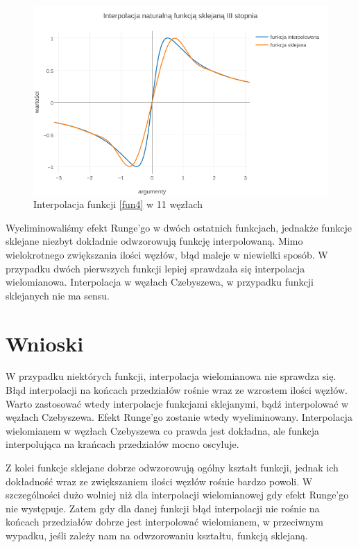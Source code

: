 \documentclass{article}
\begin{document}
\begin{figure}[ht]
	\begin{center}
		\includegraphics[width=13cm]{spline_d}
	\end{center}
	\caption{Interpolacja funkcji \eqref{fun4} w 11 węzłach}
	\label{fig:rysunek4}
\end{figure}


Wyeliminowaliśmy efekt Runge'go w dwóch ostatnich funkcjach, jednakże funkcje sklejane niezbyt dokładnie odwzorowują funkcję interpolowaną. Mimo wielokrotnego zwiększania ilości węzłów, błąd maleje w niewielki sposób. W przypadku dwóch pierwszych funkcji lepiej sprawdzała się interpolacja wielomianowa. Interpolacja w węzłach Czebyszewa, w przypadku funkcji sklejanych nie ma sensu.
	
	
\section{Wnioski}

W przypadku niektórych funkcji, interpolacja wielomianowa nie sprawdza się. Błąd interpolacji na końcach przedziałów rośnie wraz ze wzrostem ilości węzłów. Warto zastosować wtedy interpolacje funkcjami sklejanymi, bądź interpolować w węzłach Czebyszewa. Efekt Runge'go zostanie wtedy wyeliminowany. 
Interpolacja wielomianem w węzłach Czebyszewa co prawda jest dokładna, ale funkcja interpolująca na krańcach przedziałów mocno oscyluje.

Z kolei funkcje sklejane dobrze odwzorowują ogólny kształt funkcji, jednak ich dokładność wraz ze zwiększaniem ilości węzłów rośnie bardzo powoli. W szczególności dużo wolniej niż dla interpolacji wielomianowej gdy efekt Runge'go nie występuje. Zatem gdy dla danej funkcji błąd interpolacji nie rośnie na końcach przedziałów dobrze jest interpolować wielomianem, w przeciwnym wypadku, jeśli zależy nam na odwzorowaniu kształtu, funkcją sklejaną. 
\end{document}
